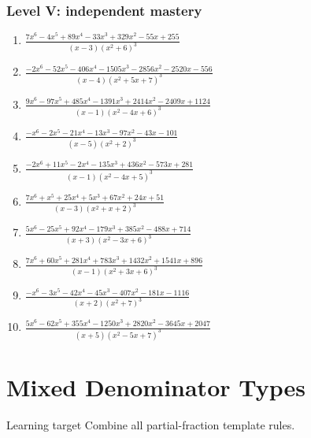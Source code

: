 \documentclass[11pt,oneside]{book}
\begin{document}
\subsection*{Level V: independent mastery}
\begin{enumerate}[leftmargin=*,label=\textbf{\arabic*.},itemsep=0.65\baselineskip]
\item $\displaystyle \frac{7 x^{6} - 4 x^{5} + 89 x^{4} - 33 x^{3} + 329 x^{2} - 55 x + 255}{\left(x - 3\right) \left(x^{2} + 6\right)^{3}}$
\item $\displaystyle \frac{- 2 x^{6} - 52 x^{5} - 406 x^{4} - 1505 x^{3} - 2856 x^{2} - 2520 x - 556}{\left(x - 4\right) \left(x^{2} + 5 x + 7\right)^{3}}$
\item $\displaystyle \frac{9 x^{6} - 97 x^{5} + 485 x^{4} - 1391 x^{3} + 2414 x^{2} - 2409 x + 1124}{\left(x - 1\right) \left(x^{2} - 4 x + 6\right)^{3}}$
\item $\displaystyle \frac{- x^{6} - 2 x^{5} - 21 x^{4} - 13 x^{3} - 97 x^{2} - 43 x - 101}{\left(x - 5\right) \left(x^{2} + 2\right)^{3}}$
\item $\displaystyle \frac{- 2 x^{6} + 11 x^{5} - 2 x^{4} - 135 x^{3} + 436 x^{2} - 573 x + 281}{\left(x - 1\right) \left(x^{2} - 4 x + 5\right)^{3}}$
\item $\displaystyle \frac{7 x^{6} + x^{5} + 25 x^{4} + 5 x^{3} + 67 x^{2} + 24 x + 51}{\left(x - 3\right) \left(x^{2} + x + 2\right)^{3}}$
\item $\displaystyle \frac{5 x^{6} - 25 x^{5} + 92 x^{4} - 179 x^{3} + 385 x^{2} - 488 x + 714}{\left(x + 3\right) \left(x^{2} - 3 x + 6\right)^{3}}$
\item $\displaystyle \frac{7 x^{6} + 60 x^{5} + 281 x^{4} + 783 x^{3} + 1432 x^{2} + 1541 x + 896}{\left(x - 1\right) \left(x^{2} + 3 x + 6\right)^{3}}$
\item $\displaystyle \frac{- x^{6} - 3 x^{5} - 42 x^{4} - 45 x^{3} - 407 x^{2} - 181 x - 1116}{\left(x + 2\right) \left(x^{2} + 7\right)^{3}}$
\item $\displaystyle \frac{5 x^{6} - 62 x^{5} + 355 x^{4} - 1250 x^{3} + 2820 x^{2} - 3645 x + 2047}{\left(x + 5\right) \left(x^{2} - 5 x + 7\right)^{3}}$
\end{enumerate}
\chapter{Mixed Denominator Types}
\begin{rulebox}{Learning target}
Combine all partial-fraction template rules.
\end{rulebox}
\end{document}
